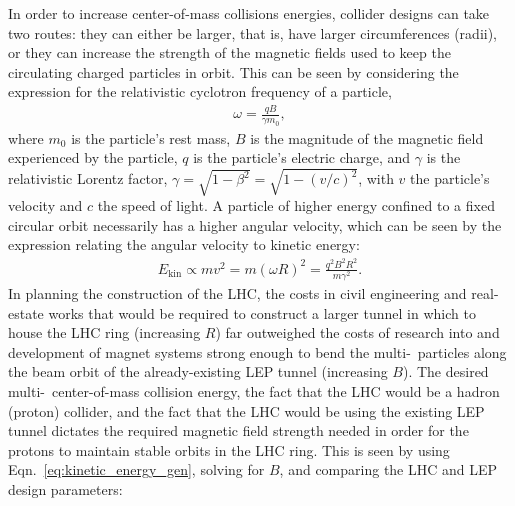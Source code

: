 
In order to increase center-of-mass collisions energies, collider designs can take two routes: they can
either be larger, that is, have larger circumferences (radii), or they can increase the strength of the magnetic
fields used to keep the circulating charged particles in orbit. This can be seen by considering the expression
for the relativistic cyclotron frequency of a particle,
\begin{align}
    \omega = \frac{qB}{\gamma m_0},
    \label{eq:rel_cyclotron}
\end{align}
where $m_0$ is the particle's rest mass, $B$ is the magnitude of the magnetic field experienced by the
particle, $q$ is the particle's electric charge, and $\gamma$ is the relativistic Lorentz factor, $\gamma = \sqrt{1 - \beta^2} = \sqrt{1 - (v/c)^2}$,
with $v$ the particle's velocity and $c$ the speed of light. A particle of higher energy confined
to a fixed circular orbit necessarily has a higher
angular velocity, which can be seen by the expression relating the angular velocity to kinetic energy:
\begin{align}
    E_{\text{kin}} \propto m v^2 = m(\omega R)^2 = \frac{q^2 B^2 R^2}{m \gamma^2}.
    \label{eq:kinetic_energy_gen}
\end{align}
In planning the construction of the LHC, the costs in civil engineering and real-estate works that would
be required to construct a larger tunnel in which to house the LHC ring (increasing $R$) far outweighed
the costs of research into and development of magnet systems strong enough to bend the
multi-\TeV~particles along the beam orbit of the already-existing LEP tunnel (increasing $B$).
The desired multi-\TeV~center-of-mass collision energy, the fact that the LHC would be a hadron (proton)
collider, and the fact that the LHC would be using the existing LEP tunnel dictates the required magnetic
field strength needed in order for the protons to maintain stable orbits in the LHC ring. This
is seen by using Eqn.~\ref{eq:kinetic_energy_gen}, solving for $B$, and comparing the LHC and LEP
design parameters:
